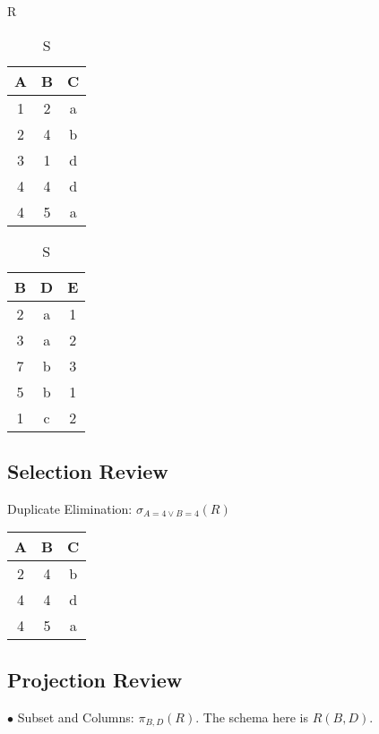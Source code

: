 \documentclass[twoside]{article}
\begin{document}
\begin{table}[!htb]
    \begin{minipage}{.5\linewidth}
      \caption{R}
      \centering
        \begin{tabular}{c|c|c}
            A & B & C \\
            \hline
            1 & 2 & a \\
            2 & 4 & b \\
            3 & 1 & d \\
            4 & 4 & d \\
            4 & 5 & a \\
        \end{tabular}
    \end{minipage}
    \begin{minipage}{.25\linewidth}
      \centering
        \caption{S}
        \begin{tabular}{c|c|c}
            B & D & E \\
            \hline
            2 & a & 1 \\
            3 & a & 2 \\
            7 & b & 3 \\
            5 & b & 1 \\
            1 & c & 2 \\
        \end{tabular}
    \end{minipage} 
\end{table}

\subsection*{Selection Review}
Duplicate Elimination: $\sigma_{A=4 \vee B=4}(R)$

\begin{table}[!htb]
    \centering
    \begin{tabular}{c|c|c}
        A & B & C \\
        \hline
        2 & 4 & b \\
        4 & 4 & d \\
        4 & 5 & a \\
    \end{tabular}
\end{table}

\subsection*{Projection Review}
$\bullet$ Subset and Columns: $\pi_{B,D}(R)$. The schema here is $R(B,D)$.
\end{document}
